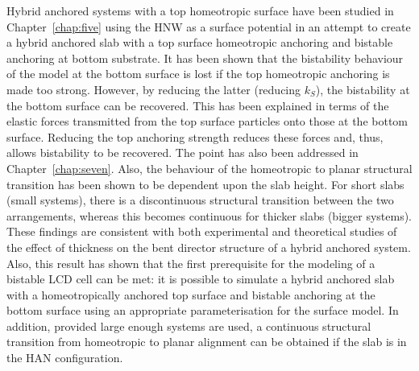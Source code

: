 Hybrid anchored systems with a top homeotropic surface have been studied in
Chapter~\ref{chap:five} using the HNW as a surface potential in an attempt to create a hybrid
anchored slab with a top surface homeotropic anchoring and bistable anchoring at bottom
substrate. It has been shown that the bistability behaviour of the model at the bottom surface
is lost if the top homeotropic anchoring is made too strong. However, by reducing the latter
(\ie reducing $k_S$), the bistability at the bottom surface can be recovered. This has been
explained in terms of the elastic forces transmitted from the top surface particles onto those at the
bottom surface. Reducing the top anchoring strength reduces these forces and, thus, 
allows bistability to be recovered. The point has also been addressed in Chapter~\ref{chap:seven}.
Also, the behaviour of the homeotropic to planar structural transition has been shown to be
dependent upon the slab height. For short slabs (\ie small systems), there is a discontinuous
structural transition between the two arrangements, whereas this becomes continuous for thicker
slabs (\ie bigger systems). These findings are consistent with both
experimental and theoretical studies of the effect of thickness on the bent director
structure of a hybrid anchored system. Also, this result has shown that the first prerequisite
for the modeling of a bistable LCD cell can be met: it is possible to simulate a hybrid
anchored slab with a homeotropically anchored top surface and bistable anchoring at the bottom
surface using an appropriate parameterisation for the surface model. In addition, provided large
enough systems are used, a continuous structural transition from homeotropic to planar alignment
can be obtained if the slab is in the HAN configuration.\\


